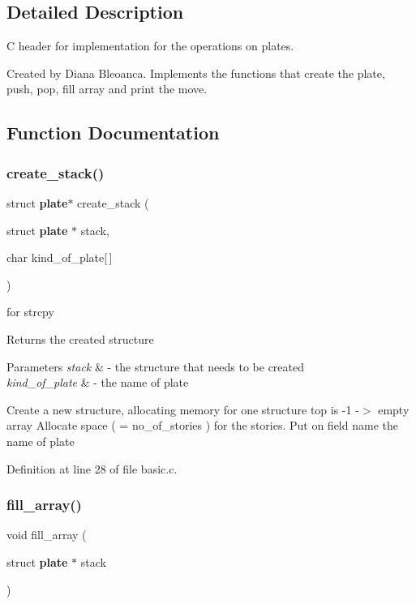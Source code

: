 \subsection{Detailed Description}
C header for implementation for the operations on plates. 

Created by Diana Bleoanca. Implements the functions that create the plate, push, pop, fill array and print the move. 

\subsection{Function Documentation}
\mbox{\label{basic_8h_a850fbb4d97ab72679ce422a8303645bf}} 
\subsubsection{create\+\_\+stack()}
{\footnotesize\ttfamily struct \textbf{ plate}$\ast$ create\+\_\+stack (\begin{DoxyParamCaption}\item[{struct \textbf{ plate} $\ast$}]{stack,  }\item[{char}]{kind\+\_\+of\+\_\+plate[$\,$] }\end{DoxyParamCaption})}



for strcpy 

Returns the created structure 
\begin{DoxyParams}{Parameters}
{\em stack} & -\/ the structure that needs to be created \\
\hline
{\em kind\+\_\+of\+\_\+plate} & -\/ the name of plate\\
\hline
\end{DoxyParams}
Create a new structure, allocating memory for one structure top is -\/1 -\/$>$ empty array Allocate space ( = no\+\_\+of\+\_\+stories ) for the stories. Put on field name the name of plate 

Definition at line 28 of file basic.\+c.

\mbox{\label{basic_8h_a53a6f99647676f5329c68f2cbfdb6274}} 
\subsubsection{fill\+\_\+array()}
{\footnotesize\ttfamily void fill\+\_\+array (\begin{DoxyParamCaption}\item[{struct \textbf{ plate} $\ast$}]{stack }\end{DoxyParamCaption})}



